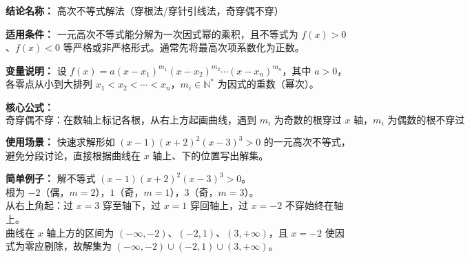 \textbf{结论名称：} 高次不等式解法（穿根法/穿针引线法，奇穿偶不穿）

\textbf{适用条件：} 一元高次不等式能分解为一次因式幂的乘积，且不等式为 $f(x)>0$、$f(x)<0$ 等严格或非严格形式。通常先将最高次项系数化为正数。

\textbf{变量说明：} 设 $f(x)=a(x-x_1)^{m_1}(x-x_2)^{m_2}\cdots(x-x_n)^{m_n}$，其中 $a>0$，各零点从小到大排列 $x_1<x_2<\cdots<x_n$，$m_i\in\mathbb{N}^*$ 为因式的重数（幂次）。

\textbf{核心公式：} 
\[
\boxed{\text{奇穿偶不穿：在数轴上标记各根，从右上方起画曲线，遇到 } m_i \text{ 为奇数的根穿过 } x \text{ 轴，} m_i \text{ 为偶数的根不穿过}}
\]

\textbf{使用场景：} 快速求解形如 $(x-1)(x+2)^2(x-3)^3>0$ 的一元高次不等式，避免分段讨论，直接根据曲线在 $x$ 轴上、下的位置写出解集。

\textbf{简单例子：} 解不等式 $(x-1)(x+2)^2(x-3)^3>0$。\\
根为 $-2$（偶，$m=2$），$1$（奇，$m=1$），$3$（奇，$m=3$）。\\
从右上角起：过 $x=3$ 穿至轴下，过 $x=1$ 穿回轴上，过 $x=-2$ 不穿始终在轴上。\\
曲线在 $x$ 轴上方的区间为 $(-\infty,-2)$、$(-2,1)$、$(3,+\infty)$，且 $x=-2$ 使因式为零应剔除，故解集为 $(-\infty,-2)\cup(-2,1)\cup(3,+\infty)$。